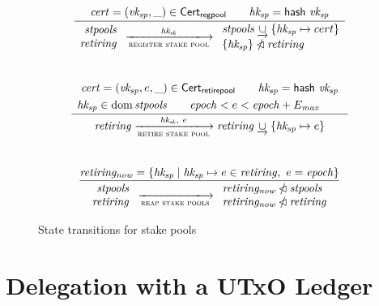 \documentclass[11pt,a4paper]{article}
\DeclareMathOperator{\dom}{dom}
\newcommand{\restrictdom}{\lhd}
\newcommand{\subtractdom}{\mathbin{\slashed{\restrictdom}}}
\newcommand{\unionoverride}{\mathbin{\underrightarrow\cup}}
\newcommand{\var}[1]{\mathit{#1}}
\newcommand{\fun}[1]{\mathsf{#1}}
\newcommand{\type}[1]{\mathsf{#1}}
\newcommand{\transitionarrow}[2]{\xlongrightarrow[\textsc{#1}]{#2}}
\begin{document}
\begin{figure}

\begin{equation*}
\frac{
  \begin{array}{c}
    \var{cert} = (\var{vk_{sp}}, \_) \in \type{Cert_{regpool}} \qquad
    \var{hk_{sp}} = \fun{hash} ~ \var{vk_{sp}}
  \end{array}
}{
  \begin{array}{r}
    \var{stpools} \\
    \var{retiring}
  \end{array}
  \transitionarrow{register stake pool}{\var{hk_{sk}}}
  \begin{array}{l}
    \var{stpools} \unionoverride \{\var{hk_{sp}} \mapsto cert\} \\
    \{\var{hk_{sp}}\} \subtractdom \var{retiring}
  \end{array}
}
\end{equation*}
%
\\[1em]
%
\begin{equation*}
\frac{
  \begin{array}{c}
    \var{cert} = (\var{vk_{sp}}, e, \_) \in \type{Cert_{retirepool}} \qquad
    \var{hk_{sp}} = \fun{hash} ~ \var{vk_{sp}}
    \\[0.3em]
    \var{hk_{sp}} \in \dom \var{stpools} \qquad
    \var{epoch} < e < \var{epoch} + E_\var{max} \qquad
  \end{array}
}{
  \var{retiring}
  \transitionarrow{retire stake pool}{\var{hk_{sk}}, ~ e}
  \var{retiring} \unionoverride \{ \var{hk_{sp}} \mapsto e \}
}
\end{equation*}
%
\\[1em]
%
\begin{equation*}
\frac{
  \var{retiring_{now}} = \{ \var{hk_{sp}} \mid
                            \var{hk_{sp}} \mapsto e \in \var{retiring}, ~
                            e = \var{epoch}
                         \}
}{
  \begin{array}{r}
    \var{stpools} \\
    \var{retiring}
  \end{array}
  \transitionarrow{reap stake pools}{}
  \begin{array}{l}
    \var{retiring_{now}} \subtractdom \var{stpools} \\
    \var{retiring_{now}} \subtractdom \var{retiring}
  \end{array}
}
\end{equation*}

\caption{State transitions for stake pools}
\label{fig:stake_pool_rules}
\end{figure}

\section{Delegation with a UTxO Ledger}




\end{document}
